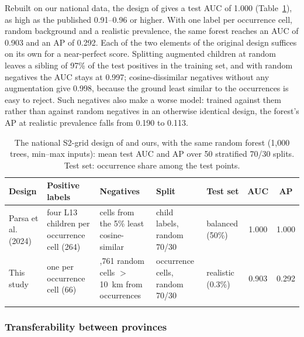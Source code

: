 \documentclass[pdflatex,sn-apa]{sn-jnl}
\begin{document}
Rebuilt on our national data, the design of \citet{Parsa2024} gives a test AUC of 1.000 (Table~\ref{tab:nat-design}), as high as the published 0.91--0.96 or higher. With one label per occurrence cell, random background and a realistic prevalence, the same forest reaches an AUC of 0.903 and an AP of 0.292. Each of the two elements of the original design suffices on its own for a near-perfect score. Splitting augmented children at random leaves a sibling of 97\% of the test positives in the training set, and with random negatives the AUC stays at 0.997; cosine-dissimilar negatives without any augmentation give 0.998, because the ground least similar to the occurrences is easy to reject. Such negatives also make a worse model: trained against them rather than against random negatives in an otherwise identical design, the forest's AP at realistic prevalence falls from 0.190 to 0.113.

\begin{table}[t]
\caption{The national S2-grid design of \citet{Parsa2024} and ours, with the same random forest (1,000 trees, min--max inputs): mean test AUC and AP over 50 stratified 70/30 splits. Test set: occurrence share among the test points.}\label{tab:nat-design}
\scriptsize
\setlength{\tabcolsep}{2.5pt}
\begin{tabular*}{\textwidth}{@{\extracolsep\fill}>{\raggedright\arraybackslash}p{1.8cm}>{\raggedright\arraybackslash}p{2.6cm}>{\raggedright\arraybackslash}p{2.7cm}>{\raggedright\arraybackslash}p{1.9cm}>{\raggedright\arraybackslash}p{1.4cm}cc}
\toprule
Design & Positive labels & Negatives & Split & Test set & AUC & AP \\
\midrule
Parsa et al. (2024) & four L13 children per occurrence cell (264) & 264 cells from the 5\% least cosine-similar & child labels, random 70/30 & balanced (50\%) & 1.000 & 1.000 \\
This study & one per occurrence cell (66) & 34,761 random cells $>$10~km from occurrences & occurrence cells, random 70/30 & realistic (0.3\%) & 0.903 & 0.292 \\
\botrule
\end{tabular*}
\end{table}

\subsubsection{Transferability between provinces}\label{sec:res-transfer}
\end{document}
